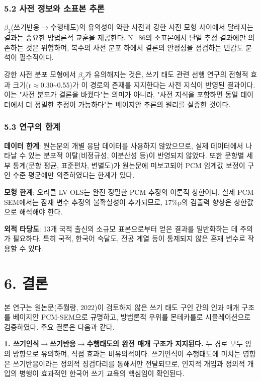 \documentclass[a4paper,10pt]{oblivoir}
\begin{document}
\subsubsection{5.2 사전 정보와 소표본 추론}

$\beta_2$(쓰기반응\ensuremath{\rightarrow}수행태도)의 유의성이 약한 사전과 강한 사전 모형 사이에서 달라지는 결과는 중요한 방법론적 교훈을 제공한다. N=86의 소표본에서 단일 추정 결과에만 의존하는 것은 위험하며, 복수의 사전 분포 하에서 결론의 안정성을 점검하는 민감도 분석이 필수적이다.

강한 사전 분포 모형에서 $\beta_2$가 유의해지는 것은, 쓰기 태도 관련 선행 연구의 전형적 효과 크기(r\ensuremath{\approx}0.30\~{}0.55)가 이 경로의 존재를 지지한다는 사전 지식이 반영된 결과이다. 이는 "사전 분포가 결론을 바꿨다"는 의미가 아니라, "사전 지식을 포함하면 동일 데이터에서 더 정밀한 추정이 가능하다"는 베이지안 추론의 원리를 실증한 것이다.

\subsubsection{5.3 연구의 한계}

\textbf{데이터 한계}: 원논문의 개별 응답 데이터를 사용하지 않았으므로, 실제 데이터에서 나타날 수 있는 분포적 이탈(비정규성, 이분산성 등)이 반영되지 않았다. 또한 문항별 세부 통계(문항 평균, 표준편차, 변별도)가 원논문에 미보고되어 PCM 임계값 보정이 구인 수준 평균에만 의존하였다는 한계가 있다.

\textbf{모형 한계}: 오라클 LV-OLS는 완전 정밀한 PCM 추정의 이론적 상한이다. 실제 PCM-SEM에서는 잠재 변수 추정의 불확실성이 추가되므로, 17\%p의 검출력 향상은 상한값으로 해석해야 한다.

\textbf{외적 타당도}: 13개 국적 출신의 소규모 표본으로부터 얻은 결과를 일반화하는 데 주의가 필요하다. 특히 국적, 한국어 숙달도, 전공 계열 등이 통제되지 않은 혼재 변수로 작용할 수 있다.


\section{6. 결론}

본 연구는 원논문(주월랑, 2022)이 검토하지 않은 쓰기 태도 구인 간의 인과 매개 구조를 베이지안 PCM-SEM으로 규명하고, 방법론적 우위를 몬테카를로 시뮬레이션으로 검증하였다. 주요 결론은 다음과 같다.

\textbf{1. 쓰기인식\ensuremath{\rightarrow}쓰기반응\ensuremath{\rightarrow}수행태도의 완전 매개 구조가 지지된다.} 두 경로 모두 양의 방향으로 유의하며, 직접 효과는 비유의적이다. 쓰기인식이 수행태도에 미치는 영향은 쓰기반응이라는 정의적 징검다리를 통해서만 전달되므로, 인지적 개입과 정의적 개입의 병행이 효과적인 한국어 쓰기 교육의 핵심임이 확인된다.
\end{document}
